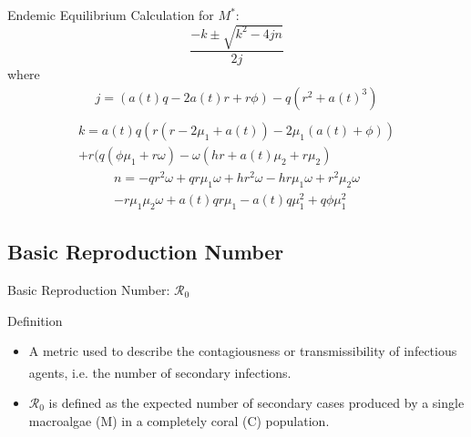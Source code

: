 \documentclass{beamer}
\begin{document}
\begin{frame}{Endemic Equilibrium}
Calculation for $M^{*}$:\\
\begin{equation*}
    \frac{-k \pm \sqrt{k^2 - 4jn}}{2j}
\end{equation*}
where
\begin{multline*}
    j = (a(t)q-2a(t)r+r \phi ) - q(r^{2}+a(t)^{3})\\
\end{multline*}
\vspace{-1.5cm}
\begin{multline*}
    k = a(t)q(r(r-2\mu_{1}+a(t))-2\mu_{1}(a(t)+\phi )) \\
    + r(q(\phi \mu_{1} + r \omega ) - \omega(hr+a(t) \mu_{2} + r\mu_{2})
\end{multline*}
\vspace{-1cm}
\begin{multline*}
    n = -qr^{2} \omega +qr\mu_{1} \omega + hr^{2} \omega - hr\mu_{1} \omega + r^2 \mu_{2} \omega\\
    - r \mu_{1} \mu_{2} \omega + a(t)qr \mu_{1} -  a(t)q\mu_{1}^{2} +q\phi \mu_{1}^{2}
\end{multline*}

\end{frame}

\subsection{Basic Reproduction Number}
\begin{frame}{Basic Reproduction Number: $\mathscr{R}_{0}$}
    \begin{block}{Definition}
        \begin{itemize}
            \item A metric used to describe the contagiousness or transmissibility of infectious agents\textsuperscript{\cite{delamater_street_leslie_yang_jacobsen_2019}}, i.e. the number of secondary infections. %
            \item $\mathscr{R}_{0}$ is defined as the expected number of secondary cases produced by a single macroalgae (M) in a completely coral (C) population. %
        \end{itemize}
    \end{block}
\end{frame}
\end{document}
